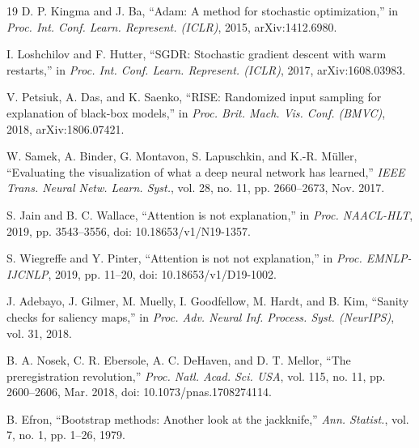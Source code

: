 \documentclass[journal]{IEEEtran}
\begin{document}
\begin{thebibliography}{19}
 D. P. Kingma and J. Ba, ``Adam: A method for stochastic optimization,'' in \textit{Proc. Int. Conf. Learn. Represent. (ICLR)}, 2015, arXiv:1412.6980.

 I. Loshchilov and F. Hutter, ``SGDR: Stochastic gradient descent with warm restarts,'' in \textit{Proc. Int. Conf. Learn. Represent. (ICLR)}, 2017, arXiv:1608.03983.

 V. Petsiuk, A. Das, and K. Saenko, ``RISE: Randomized input sampling for explanation of black-box models,'' in \textit{Proc. Brit. Mach. Vis. Conf. (BMVC)}, 2018, arXiv:1806.07421.

 W. Samek, A. Binder, G. Montavon, S. Lapuschkin, and K.-R. M\"uller, ``Evaluating the visualization of what a deep neural network has learned,'' \textit{IEEE Trans. Neural Netw. Learn. Syst.}, vol. 28, no. 11, pp. 2660--2673, Nov. 2017.

 S. Jain and B. C. Wallace, ``Attention is not explanation,'' in \textit{Proc. NAACL-HLT}, 2019, pp. 3543--3556, doi: 10.18653/v1/N19-1357.

 S. Wiegreffe and Y. Pinter, ``Attention is not not explanation,'' in \textit{Proc. EMNLP-IJCNLP}, 2019, pp. 11--20, doi: 10.18653/v1/D19-1002.

 J. Adebayo, J. Gilmer, M. Muelly, I. Goodfellow, M. Hardt, and B. Kim, ``Sanity checks for saliency maps,'' in \textit{Proc. Adv. Neural Inf. Process. Syst. (NeurIPS)}, vol. 31, 2018.

 B. A. Nosek, C. R. Ebersole, A. C. DeHaven, and D. T. Mellor, ``The preregistration revolution,'' \textit{Proc. Natl. Acad. Sci. USA}, vol. 115, no. 11, pp. 2600--2606, Mar. 2018, doi: 10.1073/pnas.1708274114.

 B. Efron, ``Bootstrap methods: Another look at the jackknife,'' \textit{Ann. Statist.}, vol. 7, no. 1, pp. 1--26, 1979.

\end{thebibliography}
\end{document}
